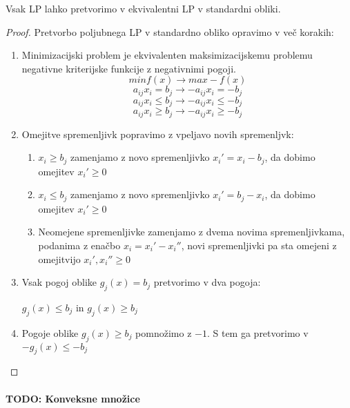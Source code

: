 \documentclass[11pt, a4paper]{article}
\begin{document}
    \begin{theorem} 
        Vsak LP lahko pretvorimo v ekvivalentni LP v standardni obliki.
    \end{theorem}

    \begin{proof}
        Pretvorbo poljubnega LP v standardno obliko opravimo v več korakih:
        \begin{enumerate}
            \item Minimizacijski problem je ekvivalenten maksimizacijskemu problemu negativne kriterijske funkcije z negativnimi pogoji.
            \[min f(x) \rightarrow max -f(x)\]
            \[a_{ij}x_i = b_j \rightarrow -a_{ij}x_i = -b_j\]
            \[a_{ij}x_i \le b_j \rightarrow -a_{ij}x_i \le -b_j\]
            \[a_{ij}x_i \ge b_j \rightarrow -a_{ij}x_i \ge -b_j\]

            \item Omejitve spremenljivk popravimo z vpeljavo novih spremenljvk:
            \begin{enumerate}[label*=\arabic*.]
                \item \(x_i \ge b_j\) zamenjamo z novo spremenljivko \(x_i'=x_i-b_j\), da dobimo omejitev \(x_i' \ge 0\)
                
                \item \(x_i \le b_j\) zamenjamo z novo spremenljivko \(x_i'=b_j-x_i\), da dobimo omejitev \(x_i' \ge 0\)
                
                \item Neomejene spremenljivke zamenjamo z dvema novima spremenljivkama, podanima z enačbo \(x_i=x_i'-x_i''\), novi spremenljivki pa sta omejeni z omejitvijo \(x_i',x_i'' \ge 0\) 
            \end{enumerate}

            \item Vsak pogoj oblike \(g_j(x) = b_j\) pretvorimo v dva pogoja:
            \par
            \(g_j(x) \le b_j\) in \(g_j(x) \ge b_j\)

            \item Pogoje oblike \(g_j(x) \ge b_j\) pomnožimo z \(-1\). S tem ga pretvorimo v \(-g_j(x) \le -b_j\)
        \end{enumerate}
    \end{proof}

    \paragraph{TODO: Konveksne množice}
    \clearpage
\end{document}
